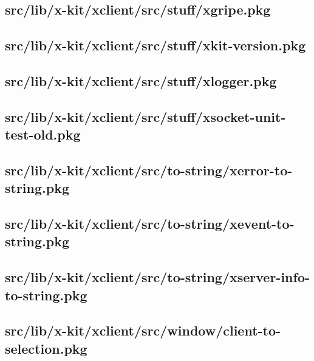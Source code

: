 \subsection{src/lib/x-kit/xclient/src/stuff/xgripe.pkg}


\subsection{src/lib/x-kit/xclient/src/stuff/xkit-version.pkg}


\subsection{src/lib/x-kit/xclient/src/stuff/xlogger.pkg}


\subsection{src/lib/x-kit/xclient/src/stuff/xsocket-unit-test-old.pkg}


\subsection{src/lib/x-kit/xclient/src/to-string/xerror-to-string.pkg}


\subsection{src/lib/x-kit/xclient/src/to-string/xevent-to-string.pkg}


\subsection{src/lib/x-kit/xclient/src/to-string/xserver-info-to-string.pkg}


\subsection{src/lib/x-kit/xclient/src/window/client-to-selection.pkg}


